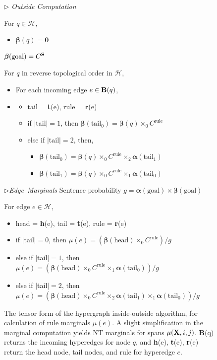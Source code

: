 \documentclass[11pt]{article}
\newcommand{\bS}{{\bf S}}
\newcommand{\bX}{{\bf X}}
\newcommand{\balpha}{\bm{\alpha}}
\newcommand{\bbeta}{\bm{\beta}}
\begin{document}
\begin{figure}[h!]
\begin{footnotesize}
{{				
		$\triangleright$ \emph{Outside Computation}
				
		For $q \in \mathcal{H}$,
		\begin{itemize}[label={},nolistsep]
			\item $\bbeta(q) = \bm{0}$
		\end{itemize}
		$\bbeta(\textrm{goal}) = C^\bS$
		
		For $q$ in reverse topological order in $\mathcal{H}$,
		\begin{itemize}[label={},nolistsep]
			\item For each incoming edge $e \in {\bf B}(q)$,
			\item \begin{itemize}[label={}]
				\item tail = {\bf t}(e), rule = {\bf r}(e)
				\item if $|$tail$| = 1$, then $\bbeta(\textrm{tail}_0) = \bbeta(q) \times_0 C^{\textrm{rule}}$
				\item else if $|$tail$| = 2$, then,
					\begin{itemize}[label={}]
						\item $\bbeta(\textrm{tail}_0) = \bbeta(q) \times_0 C^{\textrm{rule}} \times_2 \balpha(\textrm{tail}_1)$
						\item $\bbeta(\textrm{tail}_1) = \bbeta(q) \times_0 C^{\textrm{rule}} \times_1 \balpha(\textrm{tail}_0)$						
					\end{itemize}

			\end{itemize}
		\end{itemize}
			

		\hbox{$\triangleright$\emph{Edge Marginals}}
		Sentence probability $g = \balpha(\textrm{goal}) \times \bbeta(\textrm{goal})$
		
		For edge $e \in \mathcal{H}$, 
			\begin{itemize}[label={},nolistsep]
					\item head = {\bf h}(e), tail = {\bf t}(e), rule = {\bf r}(e)
					\item if $|$tail$| = 0$, then $\mu(e) = (\bbeta(\textrm{head}) \times_0 C^{\textrm{rule}}) / g$
					\item else if $|$tail$| = 1$, then $\mu(e) = (\bbeta(\textrm{head}) \times_0 C^{\textrm{rule}} \times_1 \balpha(\textrm{tail}_0)) / g$
					\item else if $|$tail$| = 2$, then $\mu(e) = (\bbeta(\textrm{head}) \times_0 C^{\textrm{rule}} \times_2 \balpha(\textrm{tail}_1) \times_1 \balpha(\textrm{tail}_0)) / g$					
			\end{itemize}
}}
\end{footnotesize}
\caption{The tensor form of the hypergraph inside-outside algorithm, for calculation of rule marginals $\mu(e)$.  
A slight simplification in the marginal computation yields NT marginals for spans $\mu(\bX, i, j)$.
{\bf B}(q) returns the incoming hyperedges for node $q$, and {\bf h}(e), {\bf t}(e), {\bf r}(e) return the head node, tail nodes, and rule for hyperedge $e$.} 
\vspace{-0.5cm}
\label{fig:hg_io_spec}
\end{figure}
\end{document}
